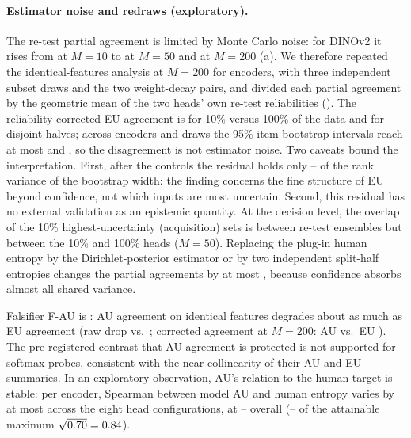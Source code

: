 \documentclass[twoside]{article}
\theoremstyle{definition}
\theoremstyle{remark}
\begin{document}
\paragraph{Estimator noise and redraws (exploratory).}
The re-test partial agreement is limited by Monte Carlo noise: for DINOv2 it rises from \McurveWten{} at $M=10$ to \McurveWfifty{} at $M=50$ and \McurveWtwohundred{} at $M=200$ (a).
We therefore repeated the identical-features analysis at $M=200$ for \MtwoEncs{} encoders, with three independent subset draws and the two weight-decay pairs, and divided each partial agreement by the geometric mean of the two heads' own re-test reliabilities ().
The reliability-corrected EU agreement is \MtFracWCorr{} for 10\% versus 100\% of the data and \MtHalfWCorr{} for disjoint halves; across encoders and draws the 95\% item-bootstrap intervals reach at most \MtFracWCorrHi{} and \MtHalfWCorrHi{}, so the disagreement is not estimator noise.
Two caveats bound the interpretation.
First, after the controls the residual holds only \ResidFracMin{}--\ResidFracMax{} of the rank variance of the bootstrap width: the finding concerns the fine structure of EU beyond confidence, not which inputs are most uncertain.
Second, this residual has no external validation as an epistemic quantity.
At the decision level, the overlap of the 10\% highest-uncertainty (acquisition) sets is \RdRetestWTop{} between re-test ensembles but \RdFracWTop{} between the 10\% and 100\% heads ($M=50$).
Replacing the plug-in human entropy by the Dirichlet-posterior estimator or by two independent split-half entropies changes the partial agreements by at most \SensMaxDiff{}, because confidence absorbs almost all shared variance.

Falsifier F-AU is \EtwoFalsB{}: AU agreement on identical features degrades about as much as EU agreement (raw drop \EtwoDropAU{} vs.\ \EtwoDropEU{}; corrected agreement at $M=200$: AU \MtFracAUCorr{} vs.\ EU \MtFracWCorr{}).
The pre-registered contrast that AU agreement is protected is not supported for softmax probes, consistent with the near-collinearity of their AU and EU summaries.
In an exploratory observation, AU's relation to the human target is stable: per encoder, Spearman between model AU and human entropy varies by at most \AUHumanRangeMax{} across the eight head configurations, at \AUHumanMin{}--\AUHumanMax{} overall (\AUHumanNormMin{}--\AUHumanNormMax{} of the attainable maximum $\sqrt{0.70}=0.84$).
\end{document}
